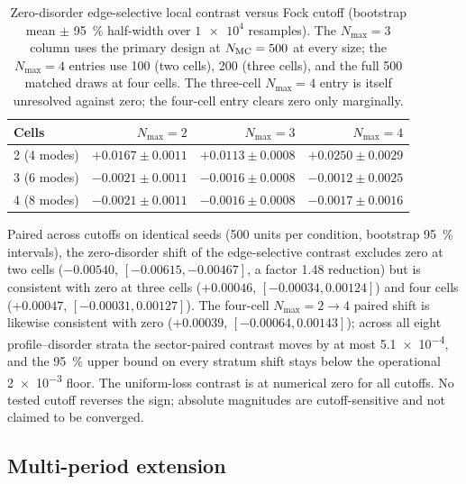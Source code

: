 \documentclass[aps,pra,preprint,superscriptaddress,amsmath,amssymb]{revtex4-2}
\begin{document}
\begin{table}[h]
\caption{Zero-disorder edge-selective local contrast versus Fock cutoff (bootstrap mean $\pm$ \qty{95}{\percent} half-width over $\num{1e4}$ resamples). The $N_{\max}=\num{3}$ column uses the primary design at $N_{\rm MC}=\num{500}$ at every size; the $N_{\max}=\num{4}$ entries use \num{100} (two cells), \num{200} (three cells), and the full \num{500} matched draws at four cells. The three-cell $N_{\max}=\num{4}$ entry is itself unresolved against zero; the four-cell entry clears zero only marginally.}
\label{tab:nmaxpanel}
\begin{ruledtabular}
\begin{tabular}{lrrr}
Cells & $N_{\max}=\num{2}$ & $N_{\max}=\num{3}$ & $N_{\max}=\num{4}$ \\
\hline
\num{2} (\num{4} modes) & $+\num{0.0167}\pm\num{0.0011}$ & $+\num{0.0113}\pm\num{0.0008}$ & $+\num{0.0250}\pm\num{0.0029}$ \\
\num{3} (\num{6} modes) & $-\num{0.0021}\pm\num{0.0011}$ & $-\num{0.0016}\pm\num{0.0008}$ & $-\num{0.0012}\pm\num{0.0025}$ \\
\num{4} (\num{8} modes) & $-\num{0.0021}\pm\num{0.0011}$ & $-\num{0.0016}\pm\num{0.0008}$ & $-\num{0.0017}\pm\num{0.0016}$ \\
\end{tabular}
\end{ruledtabular}
\end{table}

Paired across cutoffs on identical seeds (\num{500} units per condition, bootstrap \qty{95}{\percent} intervals), the zero-disorder shift of the edge-selective contrast excludes zero at two cells ($-\num{0.00540}$, $[-\num{0.00615},-\num{0.00467}]$, a factor \num{1.48} reduction) but is consistent with zero at three cells ($+\num{0.00046}$, $[-\num{0.00034},\num{0.00124}]$) and four cells ($+\num{0.00047}$, $[-\num{0.00031},\num{0.00127}]$). The four-cell $N_{\max}=\num{2}\to\num{4}$ paired shift is likewise consistent with zero ($+\num{0.00039}$, $[-\num{0.00064},\num{0.00143}]$); across all eight profile--disorder strata the sector-paired contrast moves by at most \num{5.1e-4}, and the \qty{95}{\percent} upper bound on every stratum shift stays below the operational \num{2e-3} floor. The uniform-loss contrast is at numerical zero for all cutoffs. No tested cutoff reverses the sign; absolute magnitudes are cutoff-sensitive and not claimed to be converged.

\subsection{Multi-period extension}
\label{sec:multiperiod}
\end{document}
